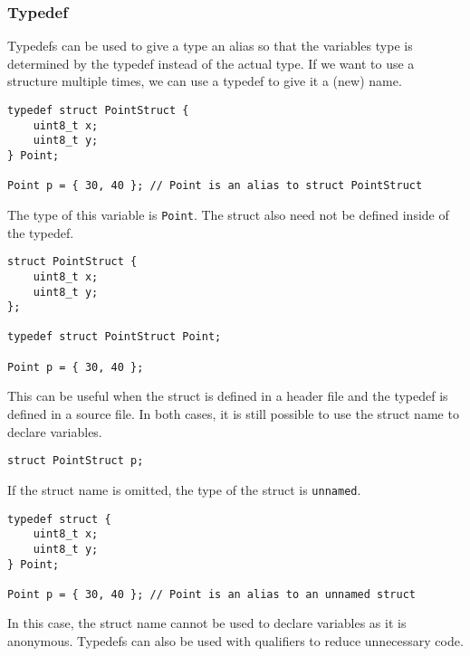 \documentclass{article}
\begin{document}
\subsubsection{Typedef}
Typedefs can be used to give a type an alias so that the variables type
is determined by the typedef instead of the actual type. If we want to
use a structure multiple times, we can use a typedef to give it a (new)
name.
\begin{verbatim}
typedef struct PointStruct {
    uint8_t x;
    uint8_t y;
} Point;

Point p = { 30, 40 }; // Point is an alias to struct PointStruct
\end{verbatim}
The type of this variable is \texttt{Point}. The struct also
need not be defined inside of the typedef.
\begin{verbatim}
struct PointStruct {
    uint8_t x;
    uint8_t y;
};

typedef struct PointStruct Point;

Point p = { 30, 40 };
\end{verbatim}
This can be useful when the struct is defined in a header file and the
typedef is defined in a source file. In both cases, it is still
possible to use the struct name to declare variables.
\begin{verbatim}
struct PointStruct p;
\end{verbatim}
If the struct name is omitted, the type of the struct is
\texttt{unnamed}.
\begin{verbatim}
typedef struct {
    uint8_t x;
    uint8_t y;
} Point;

Point p = { 30, 40 }; // Point is an alias to an unnamed struct
\end{verbatim}
In this case, the struct name cannot be used to declare variables as it
is anonymous. Typedefs can also be used with qualifiers to reduce
unnecessary code.
\end{document}
